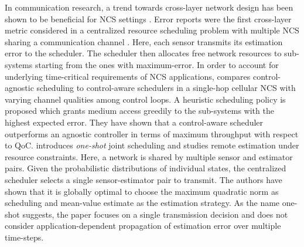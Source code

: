 In communication research, a trend towards cross-layer network design has been
shown to be beneficial for NCS settings \cite{park2017wireless}. Error reports
were the first cross-layer metric considered in a centralized resource
scheduling problem with multiple NCS sharing a communication channel
\cite{walsh2001scheduling}. Here, each sensor transmits its estimation error to
the scheduler. The scheduler then allocates free network resources to
sub-systems starting from the ones with maximum-error. In order to account for
underlying time-critical requirements of NCS applications,
\cite{vilgelm2017control} compares control-agnostic scheduling to control-aware
schedulers in a single-hop cellular NCS with varying channel qualities among
control loops. A heuristic scheduling policy is proposed which grants medium
access greedily to the sub-systems with the highest expected error. They have
shown that a control-aware scheduler outperforms an agnostic controller in terms
of maximum throughput with respect to QoC. \cite{vasconcelos2017optimal}
introduces \textit{one-shot} joint scheduling and studies remote estimation
under resource constraints. Here, a network is shared by multiple sensor and
estimator pairs. Given the probabilistic distributions of individual states, the
centralized scheduler selects a single sensor-estimator pair to transmit. The
authors have shown that it is globally optimal to choose the maximum quadratic
norm as scheduling and mean-value estimate as the estimation strategy. As the
name one-shot suggests, the paper focuses on a single transmission decision and
does not consider application-dependent propagation of estimation error over
multiple time-steps.

